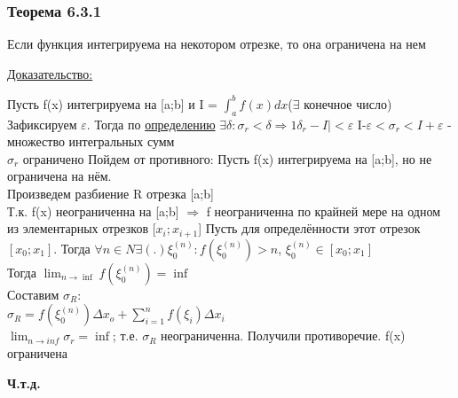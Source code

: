 \documentclass[12pt]{article}
\begin{document}
    \subsubsection*{Теорема 6.3.1}\label{th:6.3.1}
    Если функция интегрируема на некотором отрезке, то она ограничена на нем \par\noindent
    \underline{Доказательство:}
    \begin{adjustwidth}{1.5em}{1.5em}
        Пусть f(x) интегрируема на [a;b] и I = $\int_{a}^{b} f(x)dx$($\exists$ конечное число)\\
        Зафиксируем $\varepsilon$. Тогда по \underline{определению} $\exists \delta: \sigma_r<\delta \Rightarrow 1\delta_r - I|<\varepsilon$
        I-$\varepsilon<\sigma_r<I+\varepsilon$ - множество интегральных сумм\\ $\sigma_r$ ограничено
        Пойдем от противного: Пусть f(x) интегрируема на [a;b], но не ограничена на нём.\\
        Произведем разбиение R отрезка [a;b]\\
        Т.к. f(x) неограниченна на [a;b] $\Rightarrow$ f неограниченна по крайней мере на одном из элементарных отрезков [$x_i;x_{i+1}$]
        Пусть для определённости этот отрезок $[x_0;x_1]$. Тогда $\forall n \in N \exists(.) \xi^{(n)}_0
        :f(\xi^{(n)}_0)>n$, $\xi^{(n)}_0 \in [x_0;x_1]$\\
        Тогда $\lim_{n \to \inf} f(\xi^{(n)}_0) = \inf$\\
        Составим $\sigma_R$:\\
        $\sigma_R = f(\xi^{(n)}_0) \Delta x_o + \sum_{i=1}^{n} f(\xi_i) \Delta x_i$\\
        $\lim_{n \to inf} \sigma_r = \inf$; т.е. $\sigma_R$ неограниченна. Получили противоречие. f(x) ограничена
        \begin{center}
            \textbf{Ч.т.д.}
        \end{center}
    \end{adjustwidth}
\end{document}
